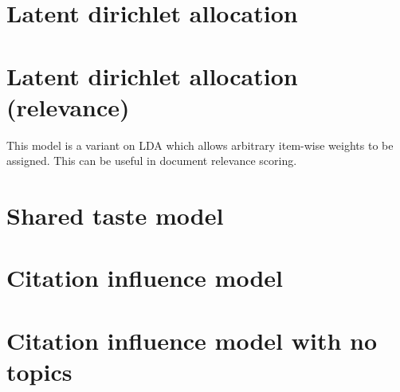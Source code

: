 \documentclass[a4paper]{article}
\begin{document}
\section{Latent dirichlet allocation}


\section{Latent dirichlet allocation (relevance)}
This model is a variant on LDA which allows arbitrary item-wise
weights to be assigned. This can be useful in document relevance
scoring.

\section{Shared taste model}

  
\section{Citation influence model}


\section{Citation influence model with no topics}

\end{document}
